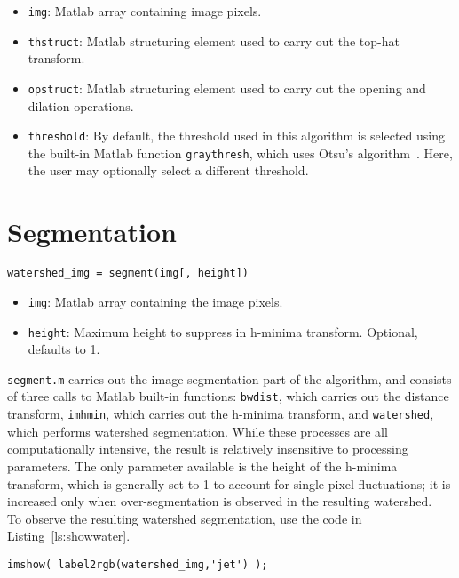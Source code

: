 \begin{itemize}
\item \texttt{img}: Matlab array containing image pixels.
\item \texttt{thstruct}: Matlab structuring element used to carry out the top-hat transform.
\item \texttt{opstruct}: Matlab structuring element used to carry out the opening and dilation operations.
\item \texttt{threshold}: By default, the threshold used in this algorithm is selected using the built-in
Matlab function \texttt{graythresh}, which uses Otsu's algorithm~\cite{otsu-threshold}. Here, the user may optionally
select a different threshold.
\end{itemize}

\section{Segmentation}

\texttt{watershed\_img = segment(img[, height])}

\begin{itemize}
\item \texttt{img}: Matlab array containing the image pixels.
\item \texttt{height}: Maximum height to suppress in h-minima transform. Optional, defaults to 1.
\end{itemize}

\texttt{segment.m} carries out the image segmentation part of the algorithm, and consists of three calls to
Matlab built-in functions: \texttt{bwdist}, which carries out the distance transform, 
\texttt{imhmin}, which carries out the h-minima transform, and \texttt{watershed}, which performs watershed
segmentation. While these processes are all computationally intensive, the result is relatively insensitive to
processing parameters. The only parameter available is the height of the h-minima transform, which is generally
set to 1 to account for single-pixel fluctuations; 
it is increased only when over-segmentation is observed in the resulting watershed.~\cite{matlab-watershed}
To observe the resulting watershed segmentation, use the code in Listing~\ref{ls:showwater}.

\begin{lstlisting}[label=ls:showwater,caption=Observe watershed segmentation]
imshow( label2rgb(watershed_img,'jet') );
\end{lstlisting}

